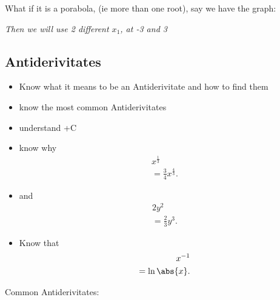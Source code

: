 \documentclass{report}
\begin{document}
    \bigbreak \noindent \bigbreak \noindent 
    What if it is a porabola, (ie more than one root), say we have the graph:
\begin{figure}[ht]
    \centering
    \label{fig:porab}
\end{figure}
    \bigbreak \noindent 
    \textit{Then we will use 2 different $x_1$, at -3 and 3}

    \bigbreak \noindent \bigbreak \noindent 
    \subsection{Antiderivitates}
    \begin{itemize}
      \item Know what it means to be an Antiderivitate and how to find them
      \item know the most common Antiderivitates
      \item understand +C
      \item know why 
        \begin{align*}
          x^{\frac{1}{3}} \\ 
          = \frac{3}{4}x^{\frac{4}{3}}
        .\end{align*}
      \item and 
        \begin{align*}
          2y^{2} \\
          = \frac{2}{3}y^{3}
        .\end{align*}
      \item Know that \begin{align*}
        x^{-1} \\
        = \ln{\abs{x}}
      .\end{align*}
    \end{itemize}
     \pagebreak \bigbreak \noindent 
     Common Antiderivitates:
     \bigbreak \noindent 
\end{document}
